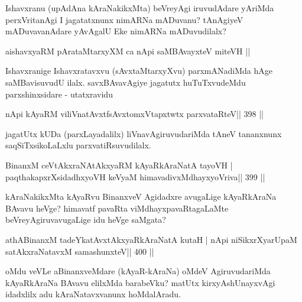 \begin{artha}
Ishavxranu (upAdAna kAraNakikxMta) beVreyAgi iruvudAdare yAriMda perxVritanAgi I jagatatxnunx nimARNa mADuvanu? tAnAgiyeV mADuvavanAdare yAvAgalU Eke nimARNa mADuvudilalx?
\end{artha}


\begin{shl}
aishavxyaRM pArataMtarxyXM ca nApi saMBAvayxteV miteVH ||
\end{shl}

\begin{artha}
Ishavxranige Ishavxratavxvu (sAvxtaMtarxyXvu) parxmANadiMda hAge saMBavisuvudU ilalx. savxBAvavAgiye jagatutx huTuTxvudeMdu parxshinxsidare - utatxravidu
\end{artha}

\begin{shl}
nApi kAyaRM viliVnatAvxtfsAvxtomxVtapxtwtx parxvataRteV\hfill || 398 ||
\end{shl}

\begin{artha}
jagatUtx kUDa (parxLayadalilx) liVnavAgiruvudariMda tAneV tananxnunx saqSiTxsikoLaLxlu parxvatiRsuvudilalx.
\end{artha}


\begin{shl}
BinanxM ceVtAkxraNAtAkxyaRM kAyaRkAraNatA tayoVH |
paqthakapxrXsidadhxyoVH keVyaM himavadivxMdhayxyoVriva\hfill|| 399 ||
\end{shl}

\begin{artha}
kAraNakikxMta kAyaRvu BinanxveV Agidadxre avugaLige kAyaRkAraNa BAvavu heVge? himavatf pavaRta viMdhayxpavaRtagaLaMte beVreyAgiruvavugaLige idu heVge saMgata?
\end{artha}


\begin{shl}
athABinanxM tadeYkatAvxtAkxyaRkAraNatA kutaH |
nApi niSikxrXyarUpaM satAkxraNatavxM samashunxteV\hfill || 400 ||
\end{shl}

\begin{artha}
oMdu veVLe aBinanxveMdare (kAyaR-kAraNa) oMdeV AgiruvudariMda kAyaRkAraNa BAvavu elilxMda barabeVku? matUtx kirxyAshUnayxvAgi idadxlilx adu kAraNatavxvanunx hoMdalAradu.
\end{artha}

